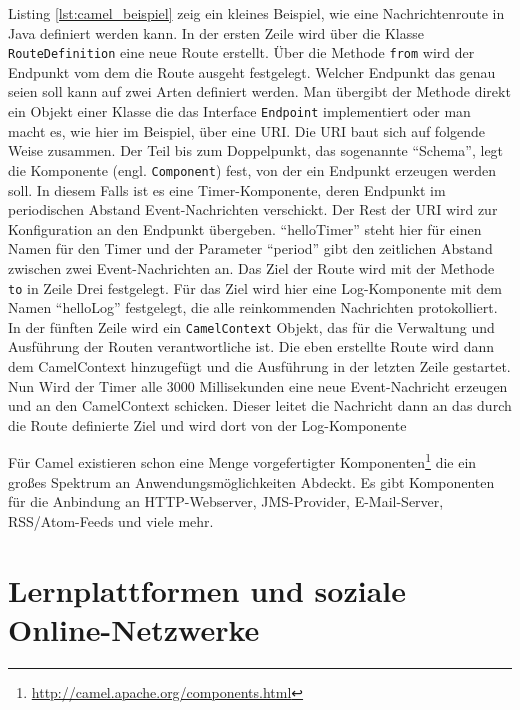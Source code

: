 Listing \ref{lst:camel_beispiel} zeig ein kleines Beispiel, wie eine Nachrichtenroute in Java definiert werden kann. In der ersten Zeile wird über die Klasse \texttt{RouteDefinition} eine neue Route erstellt. Über die Methode \texttt{from} wird der Endpunkt vom dem die Route ausgeht festgelegt. Welcher Endpunkt das genau seien soll kann auf zwei Arten definiert werden. Man übergibt der Methode direkt ein Objekt einer Klasse die das Interface \texttt{Endpoint} implementiert oder man macht es, wie hier im Beispiel, über eine URI. Die URI baut sich auf folgende Weise zusammen. Der Teil bis zum Doppelpunkt, das sogenannte \enquote{Schema}, legt die Komponente (engl. \texttt{Component}) fest, von der ein Endpunkt erzeugen werden soll. In diesem Falls ist es eine Timer-Komponente, deren Endpunkt im periodischen Abstand Event-Nachrichten verschickt. Der Rest der URI wird zur Konfiguration an den Endpunkt übergeben. \enquote{helloTimer} steht hier für einen Namen für den Timer und der Parameter \enquote{period} gibt den zeitlichen Abstand zwischen zwei Event-Nachrichten an. Das Ziel der Route wird mit der Methode \texttt{to} in Zeile Drei festgelegt. Für das Ziel wird hier eine Log-Komponente mit dem Namen \enquote{helloLog} festgelegt, die alle reinkommenden Nachrichten protokolliert. In der fünften Zeile wird ein \texttt{CamelContext} Objekt, das für die Verwaltung und Ausführung der Routen verantwortliche ist. Die eben erstellte Route wird dann dem CamelContext hinzugefügt und die Ausführung in der letzten Zeile gestartet. Nun Wird der Timer alle 3000 Millisekunden eine neue Event-Nachricht erzeugen und an den CamelContext schicken. Dieser leitet die Nachricht dann an das durch die Route definierte Ziel und wird dort von der Log-Komponente

Für Camel existieren schon eine Menge vorgefertigter Komponenten\footnote{\url{http://camel.apache.org/components.html}} die ein großes Spektrum an Anwendungsmöglichkeiten Abdeckt. Es gibt Komponenten für die Anbindung an HTTP-Webserver, JMS-Provider, E-Mail-Server, RSS/Atom-Feeds und viele mehr. 




\section{Lernplattformen und soziale Online-Netzwerke} %
\label{sec:lernplattformen_und_soziale_online_netzwerke}

